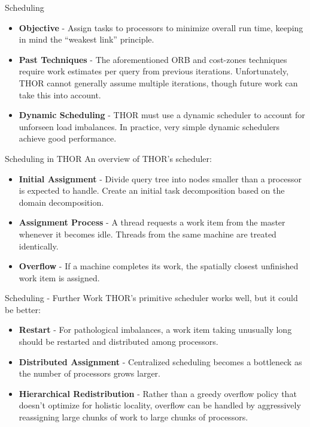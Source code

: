 \documentclass[pdf,colorBG,slideColor]{prosper}
\newcommand{\itemt}[1]{\item {\bf #1} -}
\begin{document}
\begin{slide}{Scheduling}
  \begin{itemize}
    \itemt{Objective}
    Assign tasks to processors to minimize overall run time, keeping in mind
    the ``weakest link'' principle.
    \itemt{Past Techniques}
    The aforementioned ORB and cost-zones techniques require work estimates
    per query from previous iterations.
    Unfortunately, THOR cannot generally assume multiple iterations, though
    future work can take this into account.
    \itemt{Dynamic Scheduling}
    THOR must use a dynamic scheduler to account for unforseen load imbalances.
    In practice, very simple dynamic schedulers achieve good performance.
  \end{itemize}
\end{slide}

\begin{slide}{Scheduling in THOR}
  An overview of THOR's scheduler:
  \begin{itemize}
    \itemt{Initial Assignment}
    Divide query tree into nodes smaller than a processor is expected to handle.
    Create an initial task decomposition based on the domain decomposition.
    \itemt{Assignment Process}
    A thread requests a work item from the master whenever it becomes idle.
    Threads from the same machine are treated identically.
    \itemt{Overflow}
    If a machine completes its work, the spatially closest unfinished work
    item is assigned.
  \end{itemize}
\end{slide}

\begin{slide}{Scheduling - Further Work}
  THOR's primitive scheduler works well, but it could be better:
  \begin{itemize}
    \itemt{Restart} For pathological imbalances, a work item taking unusually
    long should be restarted and distributed among processors.
    \itemt{Distributed Assignment} Centralized scheduling becomes a bottleneck
    as the number of processors grows larger.
    \itemt{Hierarchical Redistribution} Rather than a greedy overflow policy
    that doesn't optimize for holistic locality, overflow can be
    handled by aggressively reassigning large chunks of work to large chunks
    of processors.
  \end{itemize}
\end{slide}

\end{document}

